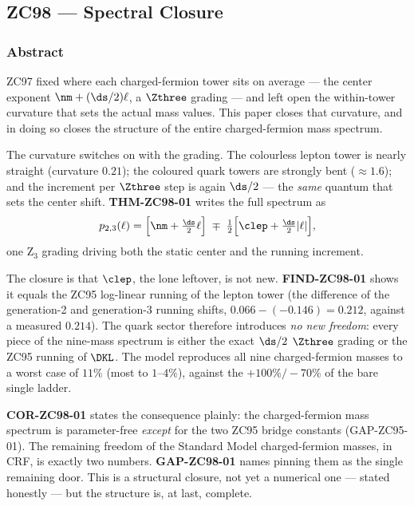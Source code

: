 \documentclass[12pt, a4paper]{article}
\begin{document}


\subsection{ZC98 --- Spectral Closure}
\subsubsection*{Abstract}
\sloppy
ZC97 fixed where each charged-fermion tower sits on average --- the center
exponent $\nm+(\ds/2)\ell$, a $\Zthree$ grading --- and left open the
within-tower curvature that sets the actual mass values. This paper closes that
curvature, and in doing so closes the structure of the entire charged-fermion
mass spectrum.

The curvature switches on with the grading. The colourless lepton tower is
nearly straight (curvature $0.21$); the coloured quark towers are strongly bent
($\approx1.6$); and the increment per $\Zthree$ step is again $\ds/2$ --- the
\emph{same} quantum that sets the center shift. \textbf{THM-ZC98-01} writes the
full spectrum as
\[
  p_{2,3}(\ell)=\Big[\nm+\tfrac{\ds}{2}\ell\Big]\;\mp\;\tfrac12\Big[\clep+\tfrac{\ds}{2}|\ell|\Big],
\]
one Z$_3$ grading driving both the static center and the running increment.

The closure is that $\clep$, the lone leftover, is not new. \textbf{FIND-ZC98-01}
shows it equals the ZC95 log-linear running of the lepton tower (the difference
of the generation-2 and generation-3 running shifts, $0.066-(-0.146)=0.212$,
against a measured $0.214$). The quark sector therefore introduces \emph{no new
freedom}: every piece of the nine-mass spectrum is either the exact $\ds/2$
$\Zthree$ grading or the ZC95 running of $\DKL$. The model reproduces all nine
charged-fermion masses to a worst case of $11\%$ (most to $1$--$4\%$), against
the $+100\%/-70\%$ of the bare single ladder.

\textbf{COR-ZC98-01} states the consequence plainly: the charged-fermion mass
spectrum is parameter-free \emph{except} for the two ZC95 bridge constants
(GAP-ZC95-01). The remaining freedom of the Standard Model charged-fermion
masses, in CRF, is exactly two numbers. \textbf{GAP-ZC98-01} names pinning them
as the single remaining door. This is a structural closure, not yet a numerical
one --- stated honestly --- but the structure is, at last, complete.
\end{document}

